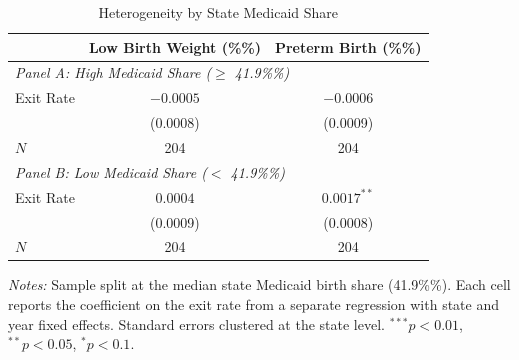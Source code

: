 \begin{table}[htbp]
\centering
\begin{threeparttable}
\caption{Heterogeneity by State Medicaid Share}
\label{tab:heterogeneity}
\begin{tabular}{lcc}
\hline\hline
 & Low Birth Weight (\%\%) & Preterm Birth (\%\%) \\
\hline
\multicolumn{3}{l}{\textit{Panel A: High Medicaid Share ($\geq$ 41.9\%\%)}} \\[3pt]
Exit Rate & $-0.0005$ & $-0.0006$ \\
 & (0.0008) & (0.0009) \\
$N$ & 204 & 204 \\[6pt]
\multicolumn{3}{l}{\textit{Panel B: Low Medicaid Share ($<$ 41.9\%\%)}} \\[3pt]
Exit Rate & $0.0004$ & $0.0017^{**}$ \\
 & (0.0009) & (0.0008) \\
$N$ & 204 & 204 \\
\hline\hline
\end{tabular}
\begin{tablenotes}[flushleft]
\footnotesize
\item \textit{Notes:} Sample split at the median state Medicaid birth share (41.9\%\%).
Each cell reports the coefficient on the exit rate from a separate regression
with state and year fixed effects. Standard errors clustered at the state level.
$^{***}p<0.01$, $^{**}p<0.05$, $^{*}p<0.1$.
\end{tablenotes}
\end{threeparttable}
\end{table}
